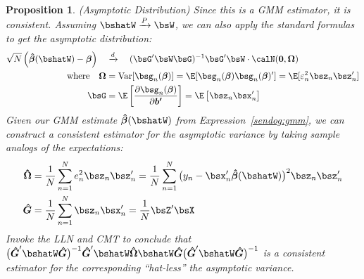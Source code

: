 \documentclass[12pt]{article}
\theoremstyle{plain}
\newtheorem{prop}[thm]{Proposition}
\theoremstyle{definition}
\theoremstyle{remark}
\newcommand{\bsvarepsilon}{\boldsymbol{\varepsilon}}
\newcommand{\bsbeta}{\boldsymbol{\beta}}
\newcommand{\bshatG}{\boldsymbol{\hat{G}}}
\newcommand{\bsOmega}{\boldsymbol{\Omega}}
\newcommand{\bshatbeta}{\boldsymbol{\hat{\beta}}}
\newcommand{\bshatOmega}{\boldsymbol{\hat{\Omega}}}
\renewcommand{\bso}{\boldsymbol{0}}
\newcommand{\bsbp}{\boldsymbol{b'}}
\newcommand{\Var}{\operatorname{Var}}
\newcommand{\pto}{\xrightarrow{P}}
\newcommand{\dto}{\xrightarrow{d}}
\newcommand{\sumnN}{\sum^N_{n=1}}
\begin{document}

\begin{prop}\emph{(Asymptotic Distribution)}
\label{prop:gmmasymptotics}
Since this is a GMM estimator, it is consistent. Assuming
$\bshatW\pto\bsW$, we can also apply the standard formulas to get the
asymptotic distribution:
\begin{align*}
  \sqrt{N}\left(\bshatbeta(\bshatW) - \bsbeta\right)
  \quad &\dto \quad
  (\bsG'\bsW\bsG)^{-1}\bsG'\bsW\cdot
  \calN(\bso,\bsOmega) \\
  \text{where}\quad
  \bsOmega &=
    \Var[\bsg_n(\bsbeta)] =
    \E[\bsg_n(\bsbeta)\bsg_n(\bsbeta)']
    = \E[\varepsilon_n^2 \bsz_n\bsz_n']
  \\
  \bsG &=
  \E\left[
    \frac{\partial \bsg_n(\bsbeta)}{\partial \bsbp}
  \right]
  =
  \E\left[
    \bsz_n\bsx_n'
  \right]
\end{align*}
Given our GMM estimate $\bshatbeta(\bshatW)$ from
Expression~\ref{sendog:gmm}, we can construct a consistent estimator for
the asymptotic variance by taking sample analogs of the expectations:
\begin{align*}
  \bshatOmega &=
  \frac{1}{N}\sumnN e_n^2\bsz_n\bsz_n'
  =
  \frac{1}{N}\sumnN \big(y_n-\bsx_n'\bshatbeta(\bshatW)\big)^2\bsz_n\bsz_n'
  \\
  \bshatG
  &=
  \frac{1}{N}\sumnN
  \bsz_n\bsx_n'
  = \frac{1}{N}\bsZ'\bsX
\end{align*}
Invoke the LLN and CMT to conclude that
$\big(\bshatG'\bshatW\bshatG\big)^{-1}
\bshatG'\bshatW\bshatOmega
\bshatW\bshatG
\big(\bshatG'\bshatW\bshatG\big)^{-1}$
is a consistent estimator for the corresponding ``hat-less'' the
asymptotic variance.
\end{prop}
\end{document}
